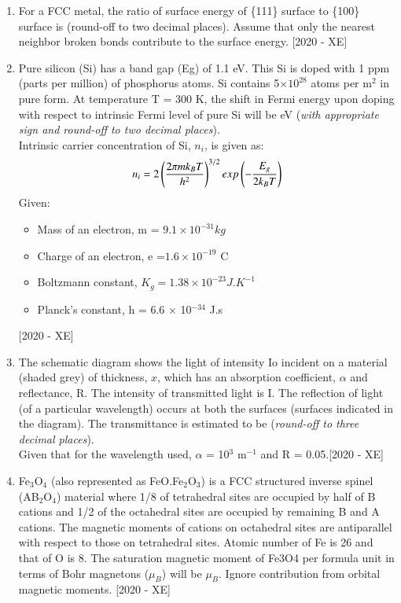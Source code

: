 \documentclass[journal]{IEEEtran}
\begin{document}
\begin{enumerate}
    \item For a FCC metal, the ratio of surface energy of \{111\} surface to \{100\} surface is \underline{\hspace{3cm}} (round-off to two decimal places). Assume that only the nearest neighbor broken bonds contribute to the surface energy. \hfill{[2020 - XE]}
    \item  Pure silicon (Si) has a band gap (Eg) of 1.1 eV. This Si is doped with 1 ppm (parts per million) of phosphorus atoms. Si contains 5$\times 10^{28}$ atoms per m$^2$ in pure form. At temperature T = 300 K, the shift in Fermi energy upon doping with respect to intrinsic Fermi level of pure Si will be \underline{\hspace{3cm}} eV (\textit{with appropriate sign and round-off to two decimal places}).\\
    Intrinsic carrier concentration of Si, $n_i$, is given as:
    $$n_i = 2\left(\frac{2\pi mk_B T}{h^2}\right)^{3/2} exp\left(-\frac{E_g}{2k_B T}\right)$$
    Given:
    \begin{itemize}
        \item Mass of an electron, m = $9.1 \times 10^{-31} kg$
        \item Charge of an electron, e =$1.6 \times 10^{-19}$ C
        \item Boltzmann constant, $K_g = 1.38 \times 10^{-23} J.K^{-1}$
        \item Planck's constant, h = 6.6 $\times$ 10$^{-34}$ J.s
    \end{itemize}\hfill{[2020 - XE]}
    \item The schematic diagram shows the light of intensity Io incident on a material (shaded grey) of thickness, $x$, which has an absorption coefficient, $\alpha$ and reflectance, R. The intensity of transmitted light is I. The reflection of light (of a particular wavelength) occurs at both the surfaces (surfaces indicated in the diagram). The transmittance is estimated to be \underline{\hspace{3cm}} (\textit{round-off to three decimal places}).\\
    Given that for the wavelength used, $\alpha$ = 10$^3$ m$^{-1}$ and R = 0.05.\hfill{[2020 - XE]}
    
    \item Fe$_3$O$_4$ (also represented as FeO.Fe$_2$O$_3$) is a FCC structured inverse spinel (AB$_2$O$_4$) material where 1/8 of tetrahedral sites are occupied by half of B cations and 1/2 of the octahedral sites are occupied by remaining B and A cations. The magnetic moments of cations on octahedral sites are antiparallel with respect to those on tetrahedral sites. Atomic number of Fe is 26 and that of O is 8. The saturation magnetic moment of Fe3O4 per formula unit in terms of Bohr magnetons ($\mu_B$) will be \underline{\hspace{3cm}} $\mu_B$. Ignore contribution from orbital magnetic moments. \hfill{[2020 - XE]}

\end{enumerate}
\end{document}
